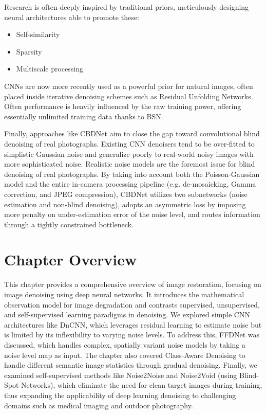 Research is often deeply inspired by traditional priors, meticulously designing neural architectures able to promote these:
\begin{itemize}
    \item Self-similarity
    \item Sparsity
    \item Multiscale processing
\end{itemize}
CNNs are now more recently used as a powerful prior for natural images, often placed inside iterative denoising schemes such as Residual Unfolding Networks. Often performance is heavily influenced by the raw training power, offering essentially unlimited training data thanks to BSN.

Finally, approaches like CBDNet aim to close the gap toward convolutional blind denoising of real photographs. Existing CNN denoisers tend to be over-fitted to simplistic Gaussian noise and generalize poorly to real-world noisy images with more sophisticated noise. Realistic noise models are the foremost issue for blind denoising of real photographs. By taking into account both the Poisson-Gaussian model and the entire in-camera processing pipeline (e.g. de-mosaicking, Gamma correction, and JPEG compression), CBDNet utilizes two subnetworks (noise estimation and non-blind denoising), adopts an asymmetric loss by imposing more penalty on under-estimation error of the noise level, and routes information through a tightly constrained bottleneck.

\section{Chapter Overview}
This chapter provides a comprehensive overview of image restoration, focusing on image denoising using deep neural networks. It introduces the mathematical observation model for image degradation and contrasts supervised, unsupervised, and self-supervised learning paradigms in denoising. We explored simple CNN architectures like DnCNN, which leverages residual learning to estimate noise but is limited by its inflexibility to varying noise levels. To address this, FFDNet was discussed, which handles complex, spatially variant noise models by taking a noise level map as input. The chapter also covered Class-Aware Denoising to handle different semantic image statistics through gradual denoising. Finally, we examined self-supervised methods like Noise2Noise and Noise2Void (using Blind-Spot Networks), which eliminate the need for clean target images during training, thus expanding the applicability of deep learning denoising to challenging domains such as medical imaging and outdoor photography.


